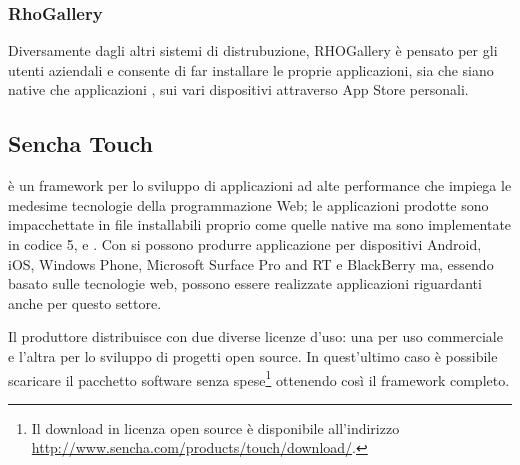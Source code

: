 			\subsubsection{RhoGallery}
				Diversamente dagli altri sistemi di distrubuzione, RHOGallery è pensato
				per gli utenti aziendali e consente di far installare le proprie
				applicazioni, sia che siano native che applicazioni \rhom{}, sui
				vari dispositivi attraverso App Store personali.


		\subsection{Sencha Touch}
			\senchat{} è un framework per lo sviluppo \crossplat{} di
			applicazioni ad	alte performance che impiega le medesime tecnologie
			della programmazione Web; le applicazioni prodotte sono
			impacchettate in file installabili proprio come quelle native ma
			sono implementate in codice \html{}5, \css{} e \js{}. Con \senchat{}
			si possono produrre applicazione per dispositivi Android, iOS,
			Windows Phone, Microsoft Surface Pro and RT e BlackBerry ma, essendo
			basato sulle tecnologie web, possono essere realizzate applicazioni
			riguardanti anche per questo settore.
			
			Il produttore distribuisce \senchat{} con due diverse licenze d'uso:
			una per uso commerciale e l'altra per lo sviluppo di progetti open 
			source. In quest'ultimo caso è possibile scaricare il pacchetto
			software senza spese\footnote{Il download in licenza open source è
			disponibile all'indirizzo \url{http://www.sencha.com/products/touch/download/}.}
			ottenendo così il framework completo.
			
